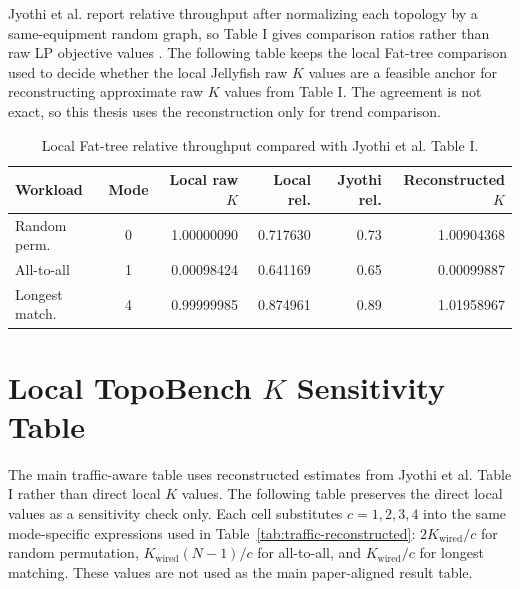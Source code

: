 \documentclass[conference]{IEEEtran}
\begin{document}
Jyothi et al. report relative throughput after normalizing each topology by a same-equipment random graph, so Table I gives comparison ratios rather than raw LP objective values \cite{jyothi2016}. The following table keeps the local Fat-tree comparison used to decide whether the local Jellyfish raw \(K\) values are a feasible anchor for reconstructing approximate raw \(K\) values from Table I. The agreement is not exact, so this thesis uses the reconstruction only for trend comparison.

\begin{table}[!t]
\centering
\caption{Local Fat-tree relative throughput compared with Jyothi et al. Table I.}
\small
\setlength{\tabcolsep}{4pt}
\begin{tabular}{@{}lcrrrr@{}}
\toprule
Workload & Mode & Local raw \(K\) & Local rel. & Jyothi rel. & Reconstructed \(K\) \\
\midrule
Random perm. & 0 & 1.00000090 & 0.717630 & 0.73 & 1.00904368 \\
All-to-all & 1 & 0.00098424 & 0.641169 & 0.65 & 0.00099887 \\
Longest match. & 4 & 0.99999985 & 0.874961 & 0.89 & 1.01958967 \\
\bottomrule
\end{tabular}
\end{table}

\section{Local TopoBench \(K\) Sensitivity Table}

The main traffic-aware table uses reconstructed estimates from Jyothi et al. Table I rather than direct local \(K\) values. The following table preserves the direct local values as a sensitivity check only. Each cell substitutes \(c=1,2,3,4\) into the same mode-specific expressions used in Table~\ref{tab:traffic-reconstructed}: \(2K_{\mathrm{wired}}/c\) for random permutation, \(K_{\mathrm{wired}}(N-1)/c\) for all-to-all, and \(K_{\mathrm{wired}}/c\) for longest matching. These values are not used as the main paper-aligned result table.
\end{document}
